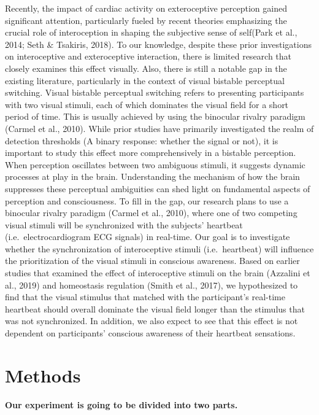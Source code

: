 \documentclass[
  man]{apa6}
\begin{document}
Recently, the impact of cardiac activity on exteroceptive perception gained significant attention, particularly fueled by recent theories emphasizing the crucial role of interoception in shaping the subjective sense of self(Park et al., 2014; Seth \& Tsakiris, 2018).
To our knowledge, despite these prior investigations on interoceptive and exteroceptive interaction, there is limited research that closely examines this effect visually. Also, there is still a notable gap in the existing literature, particularly in the context of visual bistable perceptual switching. Visual bistable perceptual switching refers to presenting participants with two visual stimuli, each of which dominates the visual field for a short period of time. This is usually achieved by using the binocular rivalry paradigm (Carmel et al., 2010). While prior studies have primarily investigated the realm of detection thresholds (A binary response: whether the signal or not), it is important to study this effect more comprehensively in a bistable perception. When perception oscillates between two ambiguous stimuli, it suggests dynamic processes at play in the brain. Understanding the mechanism of how the brain suppresses these perceptual ambiguities can shed light on fundamental aspects of perception and consciousness.
To fill in the gap, our research plans to use a binocular rivalry paradigm (Carmel et al., 2010), where one of two competing visual stimuli will be synchronized with the subjects' heartbeat (i.e.~electrocardiogram ECG signals) in real-time. Our goal is to investigate whether the synchronization of interoceptive stimuli (i.e.~heartbeat) will influence the prioritization of the visual stimuli in conscious awareness. Based on earlier studies that examined the effect of interoceptive stimuli on the brain (Azzalini et al., 2019) and homeostasis regulation (Smith et al., 2017), we hypothesized to find that the visual stimulus that matched with the participant's real-time heartbeat should overall dominate the visual field longer than the stimulus that was not synchronized. In addition, we also expect to see that this effect is not dependent on participants' conscious awareness of their heartbeat sensations.

\hypertarget{methods}{%
\section{Methods}\label{methods}}

\textbf{Our experiment is going to be divided into two parts.}
\end{document}
